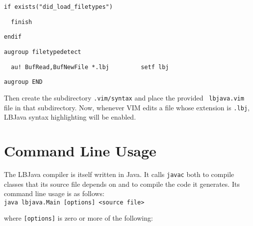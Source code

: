 \vspace{-.25cm}
\verb|if exists("did_load_filetypes")|

\verb|  finish|

\verb|endif|

\verb|augroup filetypedetect|

\verb|  au! BufRead,BufNewFile *.lbj         setf lbj|

\verb|augroup END| \\
\vspace{-.25cm}

\noindent
Then create the subdirectory {\tt .vim/syntax} and place the provided {\tt
lbjava.vim} file in that subdirectory.  Now, whenever VIM edits a file whose
extension is {\tt .lbj}, LBJava syntax highlighting will be enabled.

\newpage
\section{Command Line Usage} \label{section:commandLine}

The LBJava compiler is itself written in Java.  It calls {\tt javac} both to
compile classes that its source file depends on and to compile the code it
generates.  Its command line usage is as follows: \\

\vspace{-.25cm}
{\tt java lbjava.Main [options] <source file>} \\
\vspace{-.25cm}

\noindent
where {\tt [options]} is zero or more of the following:

